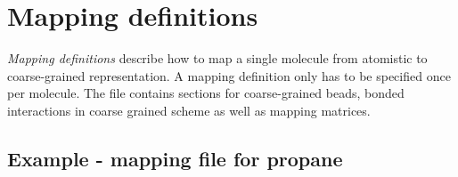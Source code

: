 \section{Mapping definitions}
\label{sec:mapping}
{\em Mapping definitions} describe how to map a single molecule from atomistic to coarse-grained representation. A mapping definition only has to be specified once per molecule. The file contains sections for coarse-grained beads, bonded interactions in coarse grained scheme as well as mapping matrices. 

\subsection{Example - mapping file for propane}


